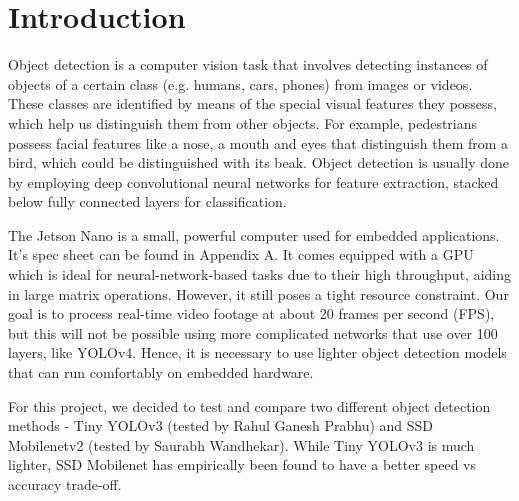 \documentclass[12pt,letterpaper]{article}
\begin{document}

\pagebreak



\thispagestyle{empty}

\tableofcontents

\pagebreak



\setcounter{page}{1}

\section{Introduction}

    Object detection is a computer vision task that involves detecting instances of objects of a certain class (e.g. humans, cars, phones) from images or videos. These classes are identified by means of the special visual features they possess, which help us distinguish them from other objects. For example, pedestrians possess facial features like a nose, a mouth and eyes that distinguish them from a bird, which could be distinguished with its beak. Object detection is usually done by employing deep convolutional neural networks for feature extraction, stacked below fully connected layers for classification.

    The Jetson Nano is a small, powerful computer used for embedded applications. It’s spec sheet can be found in Appendix A. It comes equipped with a GPU which is ideal for neural-network-based tasks due to their high throughput, aiding in large matrix operations. However, it still poses a tight resource constraint. Our goal is to process real-time video footage at about 20 frames per second (FPS), but this will not be possible using more complicated networks that use over 100 layers, like YOLOv4. Hence, it is necessary to use lighter object detection models that can run comfortably on embedded hardware. 

For this project, we decided to test and compare two different object detection methods - Tiny YOLOv3 (tested by Rahul Ganesh Prabhu) and SSD Mobilenetv2 (tested by Saurabh Wandhekar). While Tiny YOLOv3 is much lighter, SSD Mobilenet has empirically been found to have a better speed vs accuracy trade-off.
\end{document}
